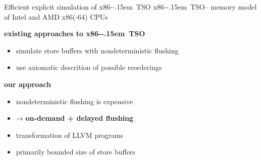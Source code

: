 \documentclass[aspectratio=169, fi]{paradise-slide}
\newcommand{\xtso}{\mbox{x86-\kern-.15em TSO}\xspace}
\begin{document}
\begin{frame}[fragile]{Efficient explicit simulation of \xtso}
  \xtso – memory model of Intel and AMD x86(-64) CPUs
  \bigskip

  \textbf{existing approaches to \xtso}
  \begin{itemize}
    \item simulate store buffers with nondeterministic flushing
    \item use axiomatic descrition of possible reorderings
  \end{itemize}
  \pause

  \bigskip
  \textbf{our approach}
  \begin{itemize}
    \item nondeterministic flushing is expensive
    \item → \textbf{on-demand + delayed flushing}
    \bigskip
    \item transformation of LLVM programs
    \item primarily bounded size of store buffers
  \end{itemize}
\end{frame}
\end{document}
